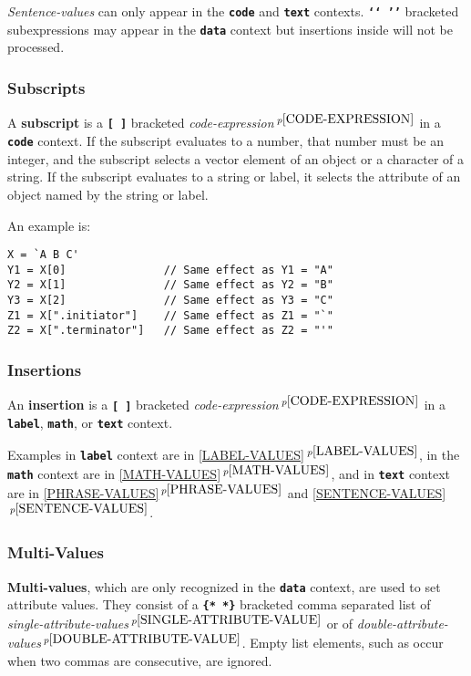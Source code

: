 \documentclass[12pt]{article}
\newcommand{\TT}[1]{{\tt \bfseries #1}}
\newcommand{\key}[1]{{\rm \bfseries #1}}
\newcommand{\itemref}[1]{\ref{#1}$\,^{p\pageref{#1}}$}
\newcommand{\pagnote}[1]{$\,^{p\pageref{#1}}$}
\newenvironment{indpar}[1][0.3in]%
	{\begin{list}{}%
		     {\setlength{\itemsep}{0in}%
		      \setlength{\topsep}{0in}%
		      \setlength{\parsep}{1ex}%
		      \setlength{\labelwidth}{#1}%
		      \setlength{\leftmargin}{#1}%
		      \addtolength{\leftmargin}{\labelsep}}%
	 \item}%
	{\end{list}}
\begin{document}
{\em Sentence-values} can only appear in the \TT{code} and \TT{text}
contexts.  \TT{`{}`~'{}'} bracketed subexpressions may appear in the
\TT{data} context but insertions inside will not be processed.

\subsubsection{Subscripts}
\label{SUBSCRIPTS}

A \key{subscript} is a \TT{[~]} bracketed
{\em code-expression}\pagnote{CODE-EXPRESSION} in a
\TT{code} context.  If the subscript evaluates to a number,
that number must be an integer, and the subscript
selects a vector element of an object or a character of a string.
If the subscript evaluates to a string or label, it selects the
attribute of an object named by the string or label.

An example is:
\begin{indpar}\begin{verbatim}
X = `A B C'
Y1 = X[0]               // Same effect as Y1 = "A"
Y2 = X[1]               // Same effect as Y2 = "B"
Y3 = X[2]               // Same effect as Y3 = "C"
Z1 = X[".initiator"]    // Same effect as Z1 = "`"
Z2 = X[".terminator"]   // Same effect as Z2 = "'"
\end{verbatim}\end{indpar}

\subsubsection{Insertions}
\label{INSERTIONS}

An \key{insertion} is a \TT{[~]} bracketed
{\em code-expression}\pagnote{CODE-EXPRESSION} in a
\TT{label}, \TT{math}, or \TT{text} context.

Examples in \TT{label} context are in \itemref{LABEL-VALUES},
in the \TT{math} context are in \itemref{MATH-VALUES},
and in \TT{text} context are in
\itemref{PHRASE-VALUES} and \itemref{SENTENCE-VALUES}.

\subsubsection{Multi-Values}
\label{MULTI-VALUES}

\key{Multi-values}, which are only recognized in
the \TT{data} context, are used to set attribute values.
They consist of a \TT{\{*~*\}} bracketed comma separated list
of {\em single-attribute-values}\pagnote{SINGLE-ATTRIBUTE-VALUE} or
of {\em double-attribute-values}\pagnote{DOUBLE-ATTRIBUTE-VALUE}.
Empty list elements, such as occur when two commas are consecutive,
are ignored.
\end{document}

